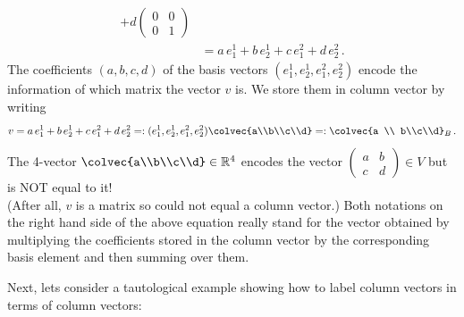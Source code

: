 \begin{example}
\begin{align*}
+d\begin{pmatrix}0&0\\0&1\end{pmatrix}\\[1mm]
&=a\,  e^1_1+b \, e^1_2+c \, e^2_1+d \, e^2_2\, .
\end{align*}
The coefficients $(a,b,c,d)$ of the basis vectors $(e^1_1,e^1_2,e^2_1,e^2_2)$ encode the information of which matrix the vector $v$ is.
We store them in column vector by writing
\[
v=a \, e^1_1+b \, e^1_2+c\,  e^2_1+d \, e^2_2=: (e^1_1,e^1_2,e^2_1,e^2_2)\colvec{a\\b\\c\\d}=:\colvec{a \\ b\\c\\d}_B\, .
\]
The 4-vector $\colvec{a\\b\\c\\d} \in \mathbb{R}^4$ encodes the vector $\begin{pmatrix}a&b\\c&d\end{pmatrix}\in V$ but is NOT equal to it! \\(After all, $v$ is a matrix so could not equal a column vector.) Both notations on the right hand side of the above equation really stand for the vector obtained by multiplying the coefficients stored in the column vector by the corresponding basis element and then summing over them.
\end{example}
 
Next, lets consider a tautological example showing how to label column vectors in terms of column vectors:

